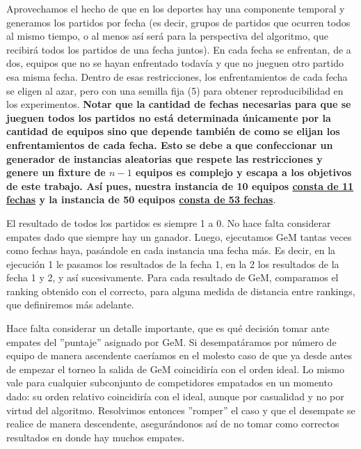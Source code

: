\begin{LaTeXdescription}
        \par Aprovechamos el hecho de que en los deportes hay una componente
        temporal y generamos los partidos por fecha (es decir, grupos de
        partidos que ocurren todos al mismo tiempo, o al menos as\'i ser\'a para
        la perspectiva del algoritmo, que recibir\'a todos los partidos de una
        fecha juntos). En cada fecha se enfrentan, de a dos, equipos que no se
        hayan enfrentado todav\'ia y que no jueguen otro partido esa misma
        fecha. Dentro de esas restricciones, los enfrentamientos de cada fecha
        se eligen al azar, pero con una semilla fija (5) para obtener
        reproducibilidad en los experimentos. \textbf{Notar que la cantidad de
        fechas necesarias para que se jueguen todos los partidos no est\'a
        determinada \'unicamente por la cantidad de equipos sino que depende
        tambi\'en de como se elijan los enfrentamientos de cada fecha. Esto se
        debe a que confeccionar un generador de instancias aleatorias que
        respete las restricciones y genere un fixture de $n-1$ equipos es
        complejo y escapa a los objetivos de este trabajo. As\'i pues, nuestra
        instancia de 10 equipos \underline{consta de 11 fechas} y la instancia
        de 50 equipos \underline{consta de 53 fechas}}.

        \par El resultado de todos los partidos es siempre 1 a 0. No hace falta
        considerar empates dado que siempre hay un ganador. Luego, ejecutamos
        GeM tantas veces como fechas haya, pas\'andole en cada instancia una
        fecha m\'as. Es decir, en la ejecuci\'on 1 le pasamos los resultados de
        la fecha 1, en la 2 los resultados de la fecha 1 y 2, y as\'i
        sucesivamente. Para cada resultado de GeM, comparamos el ranking
        obtenido con el correcto, para alguna medida de distancia entre
        rankings, que definiremos m\'as adelante.

        \par Hace falta considerar un detalle importante, que es qu\'e
        decisi\'on tomar ante empates del ''puntaje'' asignado por GeM. Si
        desempat\'aramos por n\'umero de equipo de manera ascendente caer\'iamos
        en el molesto caso de que ya desde antes de empezar el torneo la salida
        de GeM coincidir\'ia con el orden ideal. Lo mismo vale para cualquier
        subconjunto de competidores empatados en un momento dado: su orden
        relativo coincidir\'ia con el ideal, aunque por casualidad y no por
        virtud del algoritmo. Resolvimos entonces ''romper'' el caso y que el
        desempate se realice de manera descendente, asegur\'andonos as\'i de no
        tomar como correctos resultados en donde hay muchos empates.


\end{LaTeXdescription}

